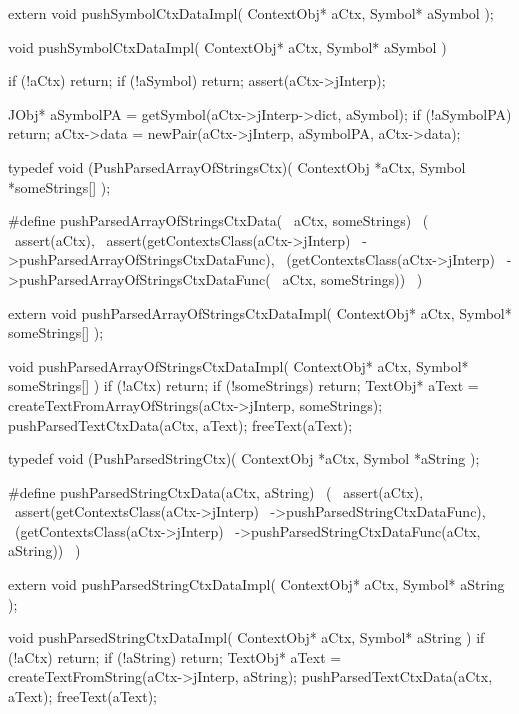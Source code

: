 \startCHeader
extern void pushSymbolCtxDataImpl(
  ContextObj* aCtx,
  Symbol* aSymbol
);
\stopCHeader
{}

\startCCode
void pushSymbolCtxDataImpl(
  ContextObj* aCtx,
  Symbol* aSymbol
) {
  if (!aCtx) return;
  if (!aSymbol) return;
  assert(aCtx->jInterp);

  JObj* aSymbolPA =
    getSymbol(aCtx->jInterp->dict, aSymbol);
  if (!aSymbolPA) return;
  aCtx->data = newPair(aCtx->jInterp, aSymbolPA, aCtx->data);
}
\stopCCode

\startCHeader
typedef void (PushParsedArrayOfStringsCtx)(
  ContextObj *aCtx,
  Symbol     *someStrings[]
);

#define pushParsedArrayOfStringsCtxData(      \
  aCtx, someStrings)                          \
  (                                           \
    assert(aCtx),                             \
    assert(getContextsClass(aCtx->jInterp)    \
      ->pushParsedArrayOfStringsCtxDataFunc), \
    (getContextsClass(aCtx->jInterp)          \
      ->pushParsedArrayOfStringsCtxDataFunc(  \
        aCtx, someStrings))                   \
  )
\stopCHeader

\setCHeaderStream{private}
\startCHeader
extern void pushParsedArrayOfStringsCtxDataImpl(
  ContextObj* aCtx,
  Symbol* someStrings[]
);
\stopCHeader
{}

\startCCode
void pushParsedArrayOfStringsCtxDataImpl(
  ContextObj* aCtx,
  Symbol* someStrings[]
) {
  if (!aCtx) return;
  if (!someStrings) return;
  TextObj* aText =
    createTextFromArrayOfStrings(aCtx->jInterp, someStrings);
  pushParsedTextCtxData(aCtx, aText);
  freeText(aText);
}
\stopCCode

\startCHeader
typedef void (PushParsedStringCtx)(
  ContextObj *aCtx,
  Symbol     *aString
);

#define pushParsedStringCtxData(aCtx, aString)      \
  (                                                 \
    assert(aCtx),                                   \
    assert(getContextsClass(aCtx->jInterp)          \
      ->pushParsedStringCtxDataFunc),               \
    (getContextsClass(aCtx->jInterp)                \
      ->pushParsedStringCtxDataFunc(aCtx, aString)) \
  )
\stopCHeader

\startCHeader
extern void pushParsedStringCtxDataImpl(
  ContextObj* aCtx,
  Symbol* aString
);
\stopCHeader
\setCHeaderStream{public}

\startCCode
void pushParsedStringCtxDataImpl(
  ContextObj* aCtx,
  Symbol* aString
) {
  if (!aCtx) return;
  if (!aString) return;
  TextObj* aText =
    createTextFromString(aCtx->jInterp, aString);
  pushParsedTextCtxData(aCtx, aText);
  freeText(aText);
}
\stopCCode

